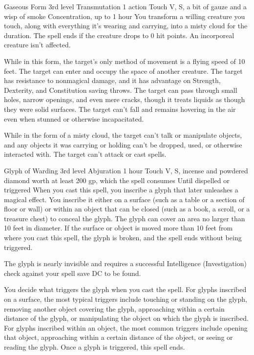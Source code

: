 \documentclass[10pt,a4paper,twoside,bg=print,twocolumn,openany,nodeprecatedcode]{dndbook}
\begin{document}


\DndSpellHeader%
{Gaseous Form}
{3rd level Transmutation}
{1 action}
{Touch}
{V, S, a bit of gauze and a wisp of smoke}
{Concentration, up to 1 hour}
You transform a willing creature you touch, along with everything it's wearing and carrying, into a misty cloud for the duration. The spell ends if the creature drops to 0 hit points. An incorporeal creature isn't affected.

While in this form, the target's only method of movement is a flying speed of 10 feet. The target can enter and occupy the space of another creature. The target has resistance to nonmagical damage, and it has advantage on Strength, Dexterity, and Constitution saving throws. The target can pass through small holes, narrow openings, and even mere cracks, though it treats liquids as though they were solid surfaces. The target can't fall and remains hovering in the air even when stunned or otherwise incapacitated.

While in the form of a misty cloud, the target can't talk or manipulate objects, and any objects it was carrying or holding can't be dropped, used, or otherwise interacted with. The target can't attack or cast spells.



\DndSpellHeader%
{Glyph of Warding}
{3rd level Abjuration}
{1 hour}
{Touch}
{V, S, incense and powdered diamond worth at least 200 gp, which the spell consumes}
{Until dispelled or triggered}
When you cast this spell, you inscribe a glyph that later unleashes a magical effect. You inscribe it either on a surface (such as a table or a section of floor or wall) or within an object that can be closed (such as a book, a scroll, or a treasure chest) to conceal the glyph. The glyph can cover an area no larger than 10 feet in diameter. If the surface or object is moved more than 10 feet from where you cast this spell, the glyph is broken, and the spell ends without being triggered.

The glyph is nearly invisible and requires a successful Intelligence (Investigation) check against your spell save DC to be found.

You decide what triggers the glyph when you cast the spell. For glyphs inscribed on a surface, the most typical triggers include touching or standing on the glyph, removing another object covering the glyph, approaching within a certain distance of the glyph, or manipulating the object on which the glyph is inscribed. For glyphs inscribed within an object, the most common triggers include opening that object, approaching within a certain distance of the object, or seeing or reading the glyph. Once a glyph is triggered, this spell ends.
\end{document}
